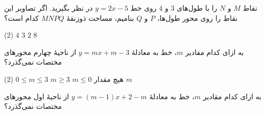 \begin{moreactivities}


\item نقاط \(M\) و \(N\) را با طول‌های \(3\) و \(4\)
روی خط \(y=2x-5\) در نظر بگیرید.
اگر تصاویر این نقاط را روی محور طول‌ها،
\(P\) و \(Q\) بنامیم، مساحت ذوزنقۀ \(MNPQ\)
کدام است؟

\begin{tasks}(2)
    \task \(4\)
    \task \(3\)
    \task \(2\)
    \task \(8\)
\end{tasks}


\item به ازای کدام مقادیر \(m\)، خط به معادلۀ
$y=mx+m-3$
از ناحیۀ چهارم محورهای مختصات نمی‌گذرد؟

\noindent
\begin{minipage}[c]{0.65\textwidth}
    \raggedleft
    \begin{tasks}(2)
        \task \(0\leq m\leq3\)
        \task \(m\geq 3\)
        \task \(m \leq 0\)
        \task هیچ مقدار \(m\)
    \end{tasks}
\end{minipage}
\hfill
\begin{minipage}[c]{0.27\textwidth}
    \centering
\end{minipage}


\item به ازای کدام مقادیر \(m\)، خط به معادلۀ
\(
    y=(m-1)x+2-m
\)
از ناحیۀ اول محورهای مختصات نمی‌گذرد؟


\end{moreactivities}
